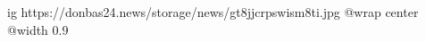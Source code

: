  
 
 
 
 

\ifcmt
  ig https://donbas24.news/storage/news/gt8jjcrpswism8ti.jpg
  @wrap center
  @width 0.9
\fi
